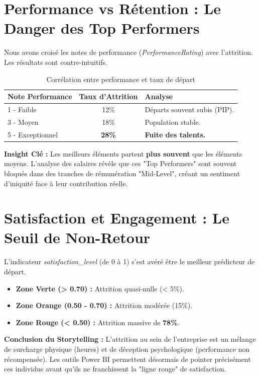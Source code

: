 \section{Performance vs Rétention : Le Danger des Top Performers}

Nous avons croisé les notes de performance (\textit{PerformanceRating}) avec l'attrition. Les résultats sont contre-intuitifs.

\begin{table}[h]
\centering
\begin{tabular}{|l|c|l|}
\hline
\textbf{Note Performance} & \textbf{Taux d'Attrition} & \textbf{Analyse} \\ \hline
1 - Faible & 12\% & Départs souvent subis (PIP). \\ \hline
3 - Moyen & 18\% & Population stable. \\ \hline
5 - Exceptionnel & \textbf{28\%} & \textbf{Fuite des talents.} \\ \hline
\end{tabular}
\caption{Corrélation entre performance et taux de départ}
\end{table}

\textbf{Insight Clé :} Les meilleurs éléments partent \textbf{plus souvent} que les éléments moyens. L'analyse des salaires révèle que ces "Top Performers" sont souvent bloqués dans des tranches de rémunération "Mid-Level", créant un sentiment d'iniquité face à leur contribution réelle.

\section{Satisfaction et Engagement : Le Seuil de Non-Retour}

L'indicateur \textit{satisfaction\_level} (de 0 à 1) s'est avéré être le meilleur prédicteur de départ.
\begin{itemize}
    \item \textbf{Zone Verte (> 0.70) :} Attrition quasi-nulle (< 5\%).
    \item \textbf{Zone Orange (0.50 - 0.70) :} Attrition modérée (15\%).
    \item \textbf{Zone Rouge (< 0.50) :} Attrition massive de \textbf{78\%}.
\end{itemize}

\textbf{Conclusion du Storytelling :} L'attrition au sein de l'entreprise est un mélange de surcharge physique (heures) et de déception psychologique (performance non récompensée). Les outils Power BI permettent désormais de pointer précisément ces individus avant qu'ils ne franchissent la "ligne rouge" de satisfaction.
